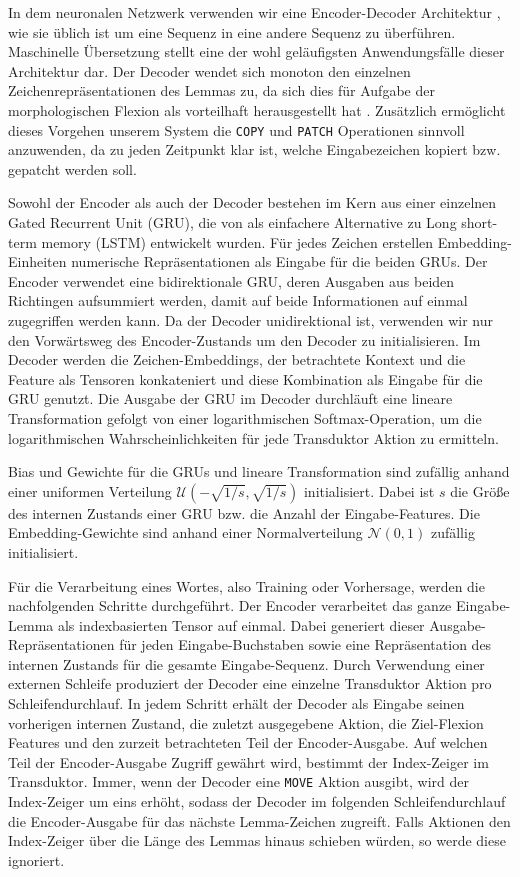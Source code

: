\documentclass[a4paper]{article}
\newcommand{\action}[1]{\texttt{#1}}
\begin{document}
In dem neuronalen Netzwerk verwenden wir eine Encoder-Decoder Architektur \citep{encdec:ChoMGBSB14, seq2seq:SutskeverVL14}, wie sie üblich ist um eine Sequenz in eine andere Sequenz zu überführen.
Maschinelle Übersetzung stellt eine der wohl geläufigsten Anwendungsfälle dieser Architektur dar.
Der Decoder wendet sich monoton den einzelnen Zeichenrepräsentationen des Lemmas zu, da sich dies für Aufgabe der morphologischen Flexion als vorteilhaft herausgestellt hat \citep{hardattention:AharoniG16,hardattention:AharoniEtAl}.
Zusätzlich ermöglicht dieses Vorgehen unserem System die \action{COPY} und \action{PATCH} Operationen sinnvoll anzuwenden, da zu jeden Zeitpunkt klar ist, welche Eingabezeichen kopiert bzw. gepatcht werden soll.

Sowohl der Encoder als auch der Decoder bestehen im Kern aus einer einzelnen Gated Recurrent Unit (GRU), die von \citet{encdec:ChoMGBSB14} als einfachere Alternative zu Long short-term memory (LSTM) entwickelt wurden.
Für jedes Zeichen erstellen Embedding-Einheiten numerische Repräsentationen als Eingabe für die beiden GRUs.
Der Encoder verwendet eine bidirektionale GRU, deren Ausgaben aus beiden Richtingen aufsummiert werden, damit auf beide Informationen auf einmal zugegriffen werden kann.
Da der Decoder unidirektional ist, verwenden wir nur den Vorwärtsweg des Encoder-Zustands um den Decoder zu initialisieren.
Im Decoder werden die Zeichen-Embeddings, der betrachtete Kontext und die Feature als Tensoren konkateniert und diese Kombination als Eingabe für die GRU genutzt.
Die Ausgabe der GRU im Decoder durchläuft eine lineare Transformation gefolgt von einer logarithmischen Softmax-Operation, um die logarithmischen Wahrscheinlichkeiten für jede Transduktor Aktion zu ermitteln. 


Bias und Gewichte für die GRUs und lineare Transformation sind zufällig anhand einer uniformen Verteilung $\mathcal{U}(-\sqrt{1/s}, \sqrt{1/s})$ initialisiert. Dabei ist $s$ die Größe des internen Zustands einer GRU bzw. die Anzahl der Eingabe-Features. Die Embedding-Gewichte sind anhand einer Normalverteilung $\mathcal{N}(0, 1)$ zufällig initialisiert.


Für die Verarbeitung eines Wortes, also Training oder Vorhersage, werden die nachfolgenden Schritte durchgeführt.
Der Encoder verarbeitet das ganze Eingabe-Lemma als indexbasierten Tensor auf einmal. Dabei generiert dieser Ausgabe-Repräsentationen für jeden Eingabe-Buchstaben  sowie eine Repräsentation des internen Zustands für die gesamte Eingabe-Sequenz.
Durch Verwendung einer externen Schleife produziert der Decoder eine einzelne Transduktor Aktion pro Schleifendurchlauf.
In jedem Schritt erhält der Decoder als Eingabe seinen vorherigen internen Zustand, die zuletzt ausgegebene Aktion, die Ziel-Flexion Features und den zurzeit betrachteten Teil der Encoder-Ausgabe.
Auf welchen Teil der Encoder-Ausgabe Zugriff gewährt wird, bestimmt der Index-Zeiger im Transduktor.
Immer, wenn der Decoder eine \action{MOVE} Aktion ausgibt, wird der Index-Zeiger um eins erhöht, sodass der Decoder im folgenden Schleifendurchlauf die Encoder-Ausgabe für das nächste Lemma-Zeichen zugreift.
Falls Aktionen den Index-Zeiger über die Länge des Lemmas hinaus schieben würden, so werde diese ignoriert.
\end{document}
